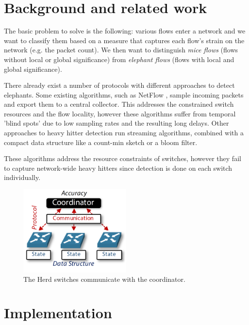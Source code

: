 \documentclass[11pt,oneside,a4paper]{article}
\begin{document}

\section{Background and related work}

The basic problem to solve is the following: various flows enter a network and we want to classify them based on a measure that captures each flow's strain on the network (e.g. the packet count). We then want to distinguish \textit{mice flows} (flows without local or global significance) from \textit{elephant flows} (flows with local and global significance). 

There already exist a number of protocols with different approaches to detect elephants. Some existing algorithms, such as NetFlow \cite{claise2004netflow}, sample incoming packets and export them to a central collector. This addresses the constrained switch resources and the flow locality, however these algorithms suffer from temporal 'blind spots' due to low sampling rates and the resulting long delays. Other approaches to heavy hitter detection run streaming algorithms, combined with a compact data structure like a count-min sketch \cite{cormode2003countmin} or a bloom filter. 

These algorithms address the resource constraints of switches, however they fail to capture network-wide heavy hitters since detection is done on each switch individually.

\begin{figure}
	\centering
	\includegraphics[width=0.5\textwidth,scale=1]{figures/global_local_paper}
	\caption{The Herd switches communicate with the coordinator. \cite{anon2019herd}}
	\label{fig:global_fig}
\end{figure}

\section{Implementation}
\end{document}
